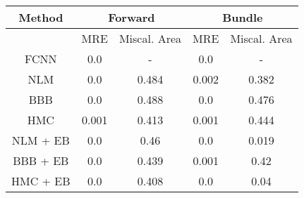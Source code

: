 \documentclass[convert={outext=.png}]{standalone}
\begin{document}
\begin{tabular}{c c c c c}
\hline
\hline
Method &  \multicolumn{2}{c}{Forward} & \multicolumn{2}{c}{Bundle} \\ \hline
 & MRE & Miscal. Area & MRE & Miscal. Area \\
 FCNN & 0.0 & - & 0.0 & - \\
 \hline
 NLM & 0.0 & 0.484 & 0.002 & 0.382 \\
 BBB & 0.0 & 0.488 & 0.0 & 0.476 \\
 HMC & 0.001 & 0.413 & 0.001 & 0.444 \\
 \hline
 NLM + EB & 0.0 & 0.46 & 0.0 & 0.019 \\
 BBB + EB & 0.0 & 0.439 & 0.001 & 0.42 \\
 HMC + EB & 0.0 & 0.408 & 0.0 & 0.04 \\
\hline
\hline
\end{tabular}
\end{document}
